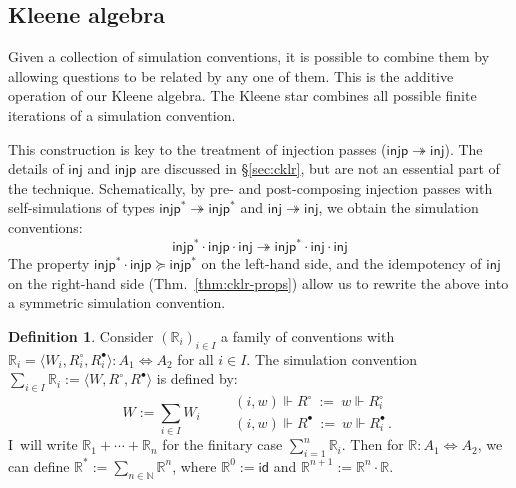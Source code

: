 \documentclass[11pt,oneside]{book}
\theoremstyle{definition}
\newtheorem{definition}[theorem]{Definition}
\newcommand{\kw}[1]{\ensuremath{ \mathsf{#1} }}
\newcommand{\que}{\circ}         %
\newcommand{\ans}{\bullet}       %
\newcommand{\scref}{\succeq} %
\begin{document}
\subsection{Kleene algebra} %

Given a collection of simulation conventions,
it is possible to combine them
by allowing questions to be related by any one of them.
This is the additive operation of our Kleene algebra.
The Kleene star combines all possible finite iterations
of a simulation convention.

This construction is key to the treatment of
injection passes
($\kw{injp} \twoheadrightarrow \kw{inj}$).
The details of $\kw{inj}$ and $\kw{injp}$
are discussed in \S\ref{sec:cklr},
but are not an essential part of the technique.
Schematically,
by pre- and post-composing injection passes
with self-simulations of types
$\kw{injp}^* \twoheadrightarrow \kw{injp}^*$ and
$\kw{inj} \twoheadrightarrow \kw{inj}$,
we obtain the simulation conventions:
\[
  \kw{injp}^* \cdot \kw{injp} \cdot \kw{inj}
  \twoheadrightarrow
  \kw{injp}^* \cdot \kw{inj} \cdot \kw{inj}
\]
The property $\kw{injp}^* \cdot \kw{injp} \scref \kw{injp}^*$
on the left-hand side,
and the idempotency of $\kw{inj}$
on the right-hand side (Thm.~\ref{thm:cklr-props})
allow us to rewrite the above into
a symmetric simulation convention.

\begin{definition} \label{def:joins} %
Consider $(\mathbb{R}_i)_{i \in I}$
a family of conventions
with
$\mathbb{R}_i = \langle W_i, R_i^\que, R_i^\ans \rangle
  : A_1 \Leftrightarrow A_2$
for all $i \in I$.
The simulation convention
$\sum_{i \in I} \mathbb{R}_i := \langle W, R^\que, R^\ans \rangle$
is defined by:
\[
  W := \sum_{i \in I} W_i  \qquad
  \begin{array}{l}
  (i, w) \Vdash R^\que \: := \: w \Vdash R_i^\que \\[1ex]
  (i, w) \Vdash R^\ans \: := \: w \Vdash R_i^\ans \,.
  \end{array}
\]
I~will write $\mathbb{R}_1 + \cdots + \mathbb{R}_n$
for the finitary case $\sum_{i=1}^n \mathbb{R}_i$.
Then for $\mathbb{R} : A_1 \Leftrightarrow A_2$,
we can define
$\mathbb{R}^* := \sum_{n \in \mathbb{N}} \mathbb{R}^n$,
where
$\mathbb{R}^0 := \kw{id}$ and
$\mathbb{R}^{n+1} := \mathbb{R}^n \cdot \mathbb{R}$.
\end{definition}
\end{document}
